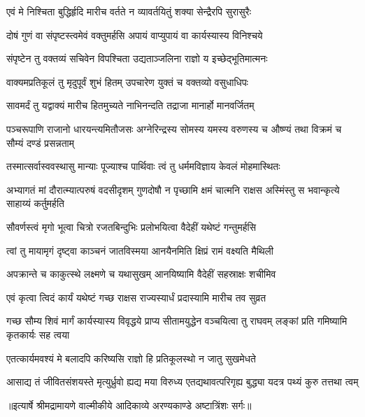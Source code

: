 \twolineshloka
{एवं मे निश्चिता बुद्धिर्हृदि मारीच वर्तते}
{न व्यावर्तयितुं शक्या सेन्द्रैरपि सुरासुरैः} %

\twolineshloka
{दोषं गुणं वा संपृष्टस्त्वमेवं वक्तुमर्हसि}
{अपायं वाप्युपायं वा कार्यस्यास्य विनिश्चये} %

\twolineshloka
{संपृष्टेन तु वक्तव्यं सचिवेन विपश्चिता}
{उद्यताञ्जलिना राज्ञो य इच्छेद्भूतिमात्मनः} %

\twolineshloka
{वाक्यमप्रतिकूलं तु मृदुपूर्वं शुभं हितम्}
{उपचारेण युक्तं च वक्तव्यो वसुधाधिपः} %

\twolineshloka
{सावमर्दं तु यद्वाक्यं मारीच हितमुच्यते}
{नाभिनन्दति तद्राजा मानार्हो मानवर्जितम्} %

\threelineshloka
{पञ्चरूपाणि राजानो धारयन्त्यमितौजसः}
{अग्नेरिन्द्रस्य सोमस्य यमस्य वरुणस्य च}
{औष्ण्यं तथा विक्रमं च सौम्यं दण्डं प्रसन्नताम्} %

\twolineshloka
{तस्मात्सर्वास्ववस्थासु मान्याः पूज्याश्च पार्थिवाः}
{त्वं तु धर्ममविज्ञाय केवलं मोहमास्थितः} %

\threelineshloka
{अभ्यागतं मां दौरात्म्यात्परुषं वदसीदृशम्}
{गुणदोषौ न पृच्छामि क्षमं चात्मनि राक्षस}
{अस्मिंस्तु स भवान्कृत्ये साहाय्यं कर्तुमर्हति} %

\twolineshloka
{सौवर्णस्त्वं मृगो भूत्वा चित्रो रजतबिन्दुभिः}
{प्रलोभयित्वा वैदेहीं यथेष्टं गन्तुमर्हसि} %

\twolineshloka
{त्वां तु मायामृगं दृष्ट्वा काञ्चनं जातविस्मया}
{आनयैनमिति क्षिप्रं रामं वक्ष्यति मैथिली} %

\twolineshloka
{अपक्रान्ते च काकुत्स्थे लक्ष्मणे च यथासुखम्}
{आनयिष्यामि वैदेहीं सहस्राक्षः शचीमिव} %

\twolineshloka
{एवं कृत्वा त्विदं कार्यं यथेष्टं गच्छ राक्षस}
{राज्यस्यार्धं प्रदास्यामि मारीच तव सुव्रत} %

\threelineshloka
{गच्छ सौम्य शिवं मार्गं कार्यस्यास्य विवृद्धये}
{प्राप्य सीतामयुद्धेन वञ्चयित्वा तु राघवम्}
{लङ्कां प्रति गमिष्यामि कृतकार्यः सह त्वया} %

\twolineshloka
{एतत्कार्यमवश्यं मे बलादपि करिष्यसि}
{राज्ञो हि प्रतिकूलस्थो न जातु सुखमेधते} %

\fourlineindentedshloka
{आसाद्य तं जीवितसंशयस्ते}
{ मृत्युर्ध्रुवो ह्यद्य मया विरुध्य}
{एतद्यथावत्परिगृह्य बुद्ध्या}
{ यदत्र पथ्यं कुरु तत्तथा त्वम्} %


{॥इत्यार्षे श्रीमद्रामायणे वाल्मीकीये आदिकाव्ये अरण्यकाण्डे अष्टात्रिंशः सर्गः॥}

